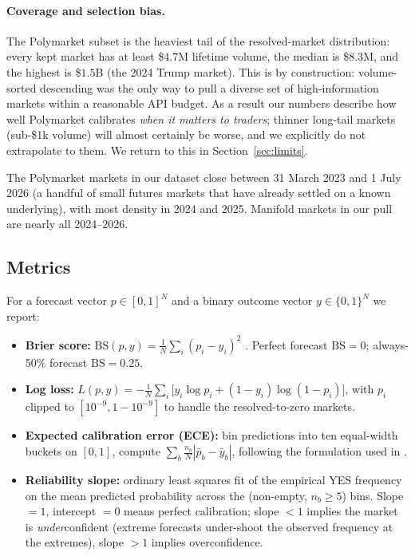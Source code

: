 \documentclass{article}
\begin{document}
\paragraph{Coverage and selection bias.}
The Polymarket subset is the heaviest tail of the resolved-market
distribution: every kept market has at least
\$$4.7$M lifetime volume, the median is \$$8.3$M, and the highest is
\$$1.5$B (the 2024 Trump market). This is by construction:
volume-sorted descending was the only way to pull a diverse set of
high-information markets within a reasonable API budget. As a result
our numbers describe how well Polymarket calibrates \emph{when it
matters to traders}; thinner long-tail markets (sub-\$1k volume) will
almost certainly be worse, and we explicitly do not extrapolate to
them. We return to this in Section~\ref{sec:limits}.

The Polymarket markets in our dataset close between 31 March 2023 and
1 July 2026 (a handful of small futures markets that have
already settled on a known underlying), with most density in 2024 and
2025. Manifold markets in our pull are nearly all 2024--2026.

\subsection{Metrics}

For a forecast vector $p \in [0,1]^N$ and a binary outcome vector
$y \in \{0,1\}^N$ we report:

\begin{itemize}
\item \textbf{Brier score:}
      $\mathrm{BS}(p,y) = \frac{1}{N} \sum_i (p_i - y_i)^2$
      \citep{brier1950}. Perfect forecast $\mathrm{BS}=0$;
      always-50\% forecast $\mathrm{BS}=0.25$.
\item \textbf{Log loss:}
      $L(p,y) = -\frac{1}{N} \sum_i \bigl[y_i \log p_i +
       (1-y_i) \log(1-p_i)\bigr]$, with $p_i$ clipped to
      $[10^{-9}, 1-10^{-9}]$ to handle the resolved-to-zero markets.
\item \textbf{Expected calibration error (ECE):} bin predictions into
      ten equal-width buckets on $[0,1]$, compute
      $\sum_b \frac{n_b}{N} |\bar p_b - \bar y_b|$, following the
      formulation used in \citet{naeini2015,guo2017}.
\item \textbf{Reliability slope:} ordinary least squares fit of the
      empirical YES frequency on the mean predicted probability across
      the (non-empty, $n_b \ge 5$) bins. Slope $=1$, intercept $=0$
      means perfect calibration; slope $<1$ implies the market is
      \emph{under}confident (extreme forecasts under-shoot the
      observed frequency at the extremes), slope $>1$ implies
      overconfidence.
\end{itemize}
\end{document}
